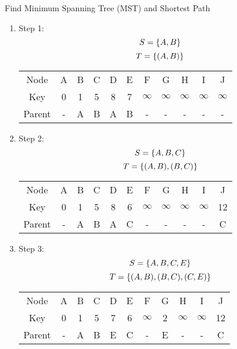 \documentclass{article}
\numberwithin{table}{section}
\numberwithin{figure}{section}
\begin{document}
\begin{section}{Find Minimum Spanning Tree (MST) and Shortest Path}
\begin{enumerate}[(A)]
\begin{enumerate}[(a)]
\begin{tcolorbox}[breakable]
\begin{enumerate}[(1)]
            \item Step 1:
            $$S = \left\{A, B\right\}$$
            $$T = \left\{(A, B)\right\}$$
            \begin{table}[H]
                \centering
                \begin{tabular}{c|cccccccccc}
                    \hline
                    Node & A & B & C & D & E & F & G & H & I & J \\
                    Key & 0 & 1 & 5 & 8 & 7 & $\infty$ & $\infty$ & $\infty$ & $\infty$ & $\infty$ \\
                    Parent & - & A & B & A & B & - & - & - & - & - \\
                    \hline
                \end{tabular}
            \end{table}
        

            \item Step 2:
            $$S = \left\{A, B, C\right\}$$
            $$T = \left\{(A, B), (B, C)\right\}$$
            \begin{table}[H]
                \centering
                \begin{tabular}{c|cccccccccc}
                    \hline
                    Node & A & B & C & D & E & F & G & H & I & J \\
                    Key & 0 & 1 & 5 & 8 & 6 & $\infty$ & $\infty$ & $\infty$ & $\infty$ & 12 \\
                    Parent & - & A & B & A & C & - & - & - & - & C \\
                    \hline
                \end{tabular}
            \end{table}
        

            \item Step 3:
            $$S = \left\{A, B, C, E\right\}$$
            $$T = \left\{(A, B), (B, C), (C, E)\right\}$$
            \begin{table}[H]
                \centering
                \begin{tabular}{c|cccccccccc}
                    \hline
                    Node & A & B & C & D & E & F & G & H & I & J \\
                    Key & 0 & 1 & 5 & 7 & 6 & $\infty$ & 2 & $\infty$ & $\infty$ & 12 \\
                    Parent & - & A & B & E & C & - & E & - & - & C \\
                    \hline
                \end{tabular}
            \end{table}
        


\end{enumerate}
\end{tcolorbox}
\end{enumerate}
\end{enumerate}
\end{section}
\end{document}
